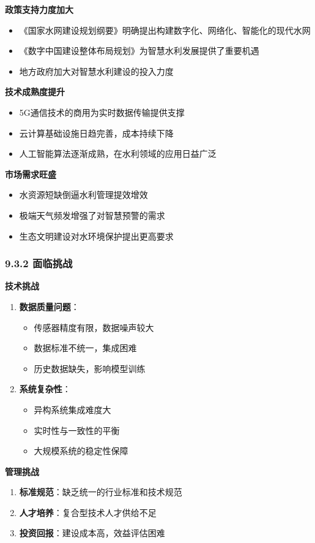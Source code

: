 \textbf{政策支持力度加大} \begin{itemize} \tightlist \item 《国家水网建设规划纲要》明确提出构建数字化、网络化、智能化的现代水网 \item 《数字中国建设整体布局规划》为智慧水利发展提供了重要机遇
\item 地方政府加大对智慧水利建设的投入力度 \end{itemize} \textbf{技术成熟度提升} \begin{itemize} \tightlist \item 5G通信技术的商用为实时数据传输提供支撑 \item
云计算基础设施日趋完善，成本持续下降 \item 人工智能算法逐渐成熟，在水利领域的应用日益广泛 \end{itemize} \textbf{市场需求旺盛} \begin{itemize} \tightlist \item
水资源短缺倒逼水利管理提效增效 \item 极端天气频发增强了对智慧预警的需求 \item 生态文明建设对水环境保护提出更高要求 \end{itemize} \subsubsection{9.3.2
面临挑战}\label{ux9762ux4e34ux6311ux6218} \textbf{技术挑战} \begin{enumerate} \def\labelenumi{\arabic{enumi}.} \tightlist \item
\textbf{数据质量问题}： \begin{itemize} \tightlist \item 传感器精度有限，数据噪声较大 \item 数据标准不统一，集成困难 \item 历史数据缺失，影响模型训练 \end{itemize}
\item \textbf{系统复杂性}： \begin{itemize} \tightlist \item 异构系统集成难度大 \item 实时性与一致性的平衡 \item 大规模系统的稳定性保障 \end{itemize}
\end{enumerate} \textbf{管理挑战} \begin{enumerate} \def\labelenumi{\arabic{enumi}.} \tightlist \item
\textbf{标准规范}：缺乏统一的行业标准和技术规范 \item \textbf{人才培养}：复合型技术人才供给不足 \item \textbf{投资回报}：建设成本高，效益评估困难 \end{enumerate}
